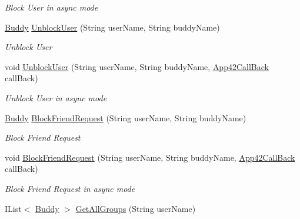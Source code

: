 \begin{DoxyCompactItemize}
\begin{DoxyCompactList}\small\item\em Block User in async mode \end{DoxyCompactList}\item 
\hyperlink{classcom_1_1shephertz_1_1app42_1_1paas_1_1sdk_1_1csharp_1_1buddy_1_1_buddy}{Buddy} \hyperlink{classcom_1_1shephertz_1_1app42_1_1paas_1_1sdk_1_1csharp_1_1buddy_1_1_buddy_service_a718b43febe9d7b26ecdfcc21a8db2e3c}{Unblock\+User} (String user\+Name, String buddy\+Name)
\begin{DoxyCompactList}\small\item\em Unblock User \end{DoxyCompactList}\item 
void \hyperlink{classcom_1_1shephertz_1_1app42_1_1paas_1_1sdk_1_1csharp_1_1buddy_1_1_buddy_service_abf1e14352963d117b2f7ee90110d07c3}{Unblock\+User} (String user\+Name, String buddy\+Name, \hyperlink{interfacecom_1_1shephertz_1_1app42_1_1paas_1_1sdk_1_1csharp_1_1_app42_call_back}{App42\+Call\+Back} call\+Back)
\begin{DoxyCompactList}\small\item\em Unblock User in async mode \end{DoxyCompactList}\item 
\hyperlink{classcom_1_1shephertz_1_1app42_1_1paas_1_1sdk_1_1csharp_1_1buddy_1_1_buddy}{Buddy} \hyperlink{classcom_1_1shephertz_1_1app42_1_1paas_1_1sdk_1_1csharp_1_1buddy_1_1_buddy_service_a74810a34fb73f69154d6aae718afb062}{Block\+Friend\+Request} (String user\+Name, String buddy\+Name)
\begin{DoxyCompactList}\small\item\em Block Friend Request \end{DoxyCompactList}\item 
void \hyperlink{classcom_1_1shephertz_1_1app42_1_1paas_1_1sdk_1_1csharp_1_1buddy_1_1_buddy_service_a67f1c42f2b0506ed93d79a137d8b0ab0}{Block\+Friend\+Request} (String user\+Name, String buddy\+Name, \hyperlink{interfacecom_1_1shephertz_1_1app42_1_1paas_1_1sdk_1_1csharp_1_1_app42_call_back}{App42\+Call\+Back} call\+Back)
\begin{DoxyCompactList}\small\item\em Block Friend Request in async mode \end{DoxyCompactList}\item 
I\+List$<$ \hyperlink{classcom_1_1shephertz_1_1app42_1_1paas_1_1sdk_1_1csharp_1_1buddy_1_1_buddy}{Buddy} $>$ \hyperlink{classcom_1_1shephertz_1_1app42_1_1paas_1_1sdk_1_1csharp_1_1buddy_1_1_buddy_service_a86a903ebc994b047f99dcc5f03946f28}{Get\+All\+Groups} (String user\+Name)

\end{DoxyCompactItemize}
